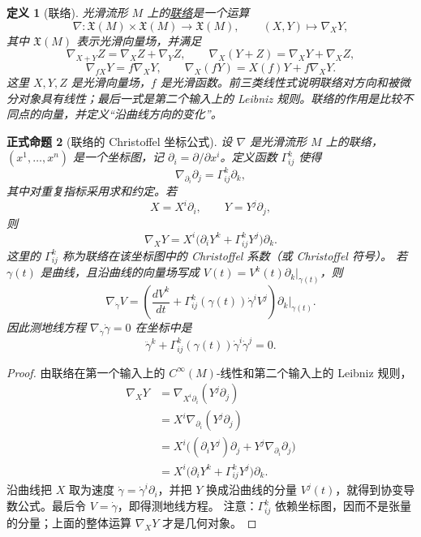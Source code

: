 \documentclass[UTF8,fontset=none,a4paper,11pt]{ctexart}
\theoremstyle{foundation-definition}
\newtheorem{definition}{定义}[section]
\theoremstyle{foundation-theorem}
\theoremstyle{foundation-proposition}
\newtheorem{proposition}[definition]{正式命题}
\theoremstyle{foundation-example}
\theoremstyle{foundation-remark}
\theoremstyle{foundation-theorem}
\newcommand{\term}[2]{\hyperref[#1]{#2}}
\begin{document}
\begin{definition}[联络]\label{def:connection}
光滑流形 \(M\) 上的\term{def:connection}{联络}是一个运算
\[
\nabla:\mathfrak X(M)\times\mathfrak X(M)\longrightarrow\mathfrak X(M),
\qquad (X,Y)\longmapsto\nabla_XY,
\]
其中 \(\mathfrak X(M)\) 表示光滑向量场，并满足
\[
\nabla_{X+Y}Z=\nabla_XZ+\nabla_YZ,\qquad
\nabla_X(Y+Z)=\nabla_XY+\nabla_XZ,
\]
\[
\nabla_{fX}Y=f\nabla_XY,\qquad
\nabla_X(fY)=X(f)Y+f\nabla_XY.
\]
这里 \(X,Y,Z\) 是光滑向量场，\(f\) 是光滑函数。前三类线性式说明联络对方向和被微分对象具有线性；最后一式是第二个输入上的 Leibniz 规则。联络的作用是比较不同点的向量，并定义“沿曲线方向的变化”。
\end{definition}

\begin{proposition}[联络的 Christoffel 坐标公式]
\label{prop:connection-coordinates}
设 \(\nabla\) 是光滑流形 \(M\) 上的联络，\((x^1,\ldots,x^n)\) 是一个坐标图，记
\(\partial_i=\partial/\partial x^i\)。定义函数 \(\Gamma^k_{ij}\) 使得
\[
\nabla_{\partial_i}\partial_j=\Gamma^k_{ij}\partial_k,
\]
其中对重复指标采用求和约定。若
\[
X=X^i\partial_i,\qquad Y=Y^j\partial_j,
\]
则
\[
\nabla_XY
=X^i\bigl(\partial_iY^k+\Gamma^k_{ij}Y^j\bigr)\partial_k.
\]
这里的 \(\Gamma^k_{ij}\) 称为联络在该坐标图中的 Christoffel 系数（或 Christoffel 符号）。
若 \(\gamma(t)\) 是曲线，且沿曲线的向量场写成
\(V(t)=V^k(t)\partial_k|_{\gamma(t)}\)，则
\[
\nabla_{\dot\gamma}V
=\left(\frac{dV^k}{dt}
+\Gamma^k_{ij}(\gamma(t))\dot\gamma^iV^j\right)\partial_k\big|_{\gamma(t)}.
\]
因此测地线方程 \(\nabla_{\dot\gamma}\dot\gamma=0\) 在坐标中是
\[
\ddot\gamma^k+\Gamma^k_{ij}(\gamma(t))\dot\gamma^i\dot\gamma^j=0.
\]
\end{proposition}

\begin{proof}
由联络在第一个输入上的 \(C^\infty(M)\)-线性和第二个输入上的 Leibniz 规则，
\[
\begin{aligned}
\nabla_XY
&=\nabla_{X^i\partial_i}(Y^j\partial_j)\\
&=X^i\nabla_{\partial_i}(Y^j\partial_j)\\
&=X^i\bigl((\partial_iY^j)\partial_j+Y^j\nabla_{\partial_i}\partial_j\bigr)\\
&=X^i\bigl(\partial_iY^k+\Gamma^k_{ij}Y^j\bigr)\partial_k.
\end{aligned}
\]
沿曲线把 \(X\) 取为速度 \(\dot\gamma=\dot\gamma^i\partial_i\)，并把 \(Y\) 换成沿曲线的分量 \(V^j(t)\)，就得到协变导数公式。最后令 \(V=\dot\gamma\)，即得测地线方程。
注意：\(\Gamma^k_{ij}\) 依赖坐标图，因而不是张量的分量；上面的整体运算 \(\nabla_XY\) 才是几何对象。
\end{proof}
\end{document}
